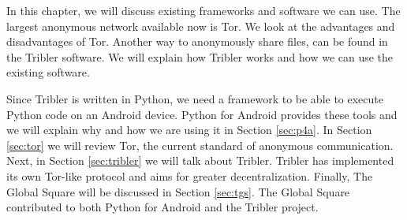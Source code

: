 In this chapter, we will discuss existing frameworks and software we can use. The largest anonymous network available now is Tor. We look at the advantages and disadvantages of Tor. Another way to anonymously share files, can be found in the Tribler software. We will explain how Tribler works and how we can use the existing software.
	
Since Tribler is written in Python, we need a framework to be able to execute Python code on an Android device. Python for Android provides these tools and we will explain why and how we are using it in Section \ref{sec:p4a}. In Section \ref{sec:tor} we will review Tor, the current standard of anonymous communication. Next, in Section \ref{sec:tribler} we will talk about Tribler. Tribler has implemented its own Tor-like protocol and aims for greater decentralization. Finally, The Global Square will be discussed in Section \ref{sec:tgs}. The Global Square contributed to both Python for Android and the Tribler project.
